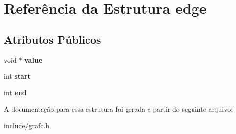\hypertarget{structedge}{}\section{Referência da Estrutura edge}
\label{structedge}
\subsection*{Atributos Públicos}
\begin{DoxyCompactItemize}
\item 
\mbox{\label{structedge_a91c3b14d69d426b3ded39e9ca8d26db7}} 
void $\ast$ {\bfseries value}
\item 
\mbox{\label{structedge_a932f908ef7a7ba5b5221c321cb811f85}} 
int {\bfseries start}
\item 
\mbox{\label{structedge_ac5d4c26a39e285e8de29e2b8e9874d29}} 
int {\bfseries end}
\end{DoxyCompactItemize}


A documentação para essa estrutura foi gerada a partir do seguinte arquivo\+:\begin{DoxyCompactItemize}
\item 
include/\hyperlink{grafo_8h}{grafo.\+h}\end{DoxyCompactItemize}
